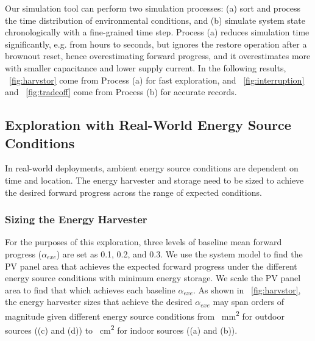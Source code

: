 Our simulation tool can perform two simulation processes: (a) sort and process the time distribution of environmental conditions, and (b) simulate system state chronologically with a fine-grained time step. 
Process (a) reduces simulation time significantly, e.g. from hours to seconds, but ignores the restore operation after a brownout reset, hence overestimating forward progress, and it overestimates more with smaller capacitance and lower supply current. 
In the following results, \figurename{~\ref{fig:harvstor}} come from Process (a) for fast exploration, and \figurename{~\ref{fig:interruption}} and \figurename{~\ref{fig:tradeoff}} come from Process (b) for accurate records. 


\subsection{Exploration with Real-World Energy Source Conditions} \label{subsec:harvstor}


In real-world deployments, ambient energy source conditions are dependent on time and location. The energy harvester and storage need to be sized to achieve the desired forward progress across the range of expected conditions. 

\subsubsection{Sizing the Energy Harvester}

For the purposes of this exploration, three levels of baseline mean forward progress ($\alpha_{exe}$) are set as 0.1, 0.2, and 0.3. We use the system model to find the PV panel area that achieves the expected forward progress under the different energy source conditions with minimum energy storage. We scale the PV panel area to find that which achieves each baseline $\alpha_{exe}$. As shown in \figurename{~\ref{fig:harvstor}}, the energy harvester sizes that achieve the desired $\alpha_{exe}$ may span orders of magnitude given different energy source conditions from \SI{}{\square\milli\meter} for outdoor sources ((c) and (d)) to \SI{}{\square\centi\meter} for indoor sources ((a) and (b)). 

